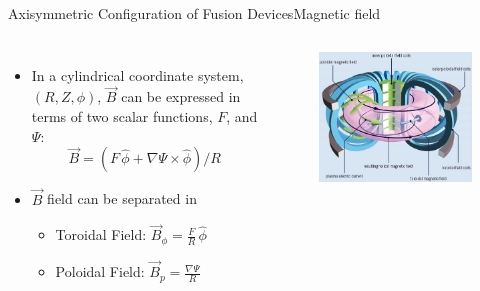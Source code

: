 \documentclass{beamer}
\begin{document}
\begin{frame}{Axisymmetric Configuration of Fusion Devices}{Magnetic field}

\begin{columns}
   \begin{itemize}
   \item In a cylindrical coordinate system,  $(R, Z, \phi)$,   $\vec{B}$
   can be expressed in terms of two scalar functions, $F$, and $\Psi$:
    \begin{equation*}%
		 \vec{B} =  (F \,  \hat{\phi}  + \nabla \Psi \times \hat{\phi} )/ R
	\end{equation*}
	\item<2-> $\vec{B}$ field can be separated in
		\begin{itemize}
			\item Toroidal Field: $\vec{B}_{\phi} = \frac{F}{R}\, \hat{\phi} $
			\item Poloidal Field: $\vec{B}_{p} = \frac{\nabla \Psi}{R}  $
		\end{itemize}

   \end{itemize}
	\begin{figure}[ht]
	\begin{center}
	\includegraphics[width=1.2\columnwidth]{magAxis.png}
	\end{center}
	\end{figure}
\end{columns}
\end{frame}
\end{document}
